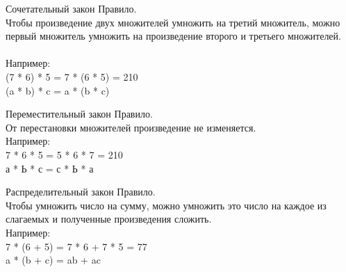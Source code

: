 \documentclass{beamer}
\begin{document}
\begin{frame}{Сочетательный закон}
Правило.\\
Чтобы произведение двух множителей умножить на третий множитель, можно первый множитель умножить на произведение второго и третьего множителей.\\
\\
Например:\\
(7 * 6) * 5 = 7 * (6 * 5) = 210\\
(a * b) * c = a * (b * c)
\end{frame}

\begin{frame}{Переместительный закон}
Правило.\\
От перестановки множителей произведение не изменяется.\\

Например:\\
7 * 6 * 5 = 5 * 6 * 7 = 210\\
а * Ь * с = с * Ь * а
\end{frame}

\begin{frame}{Распределительный закон}
Правило.\\
Чтобы умножить число на сумму, можно умножить это число на каждое из слагаемых и полученные произведения сложить.\\

Например:\\
7 * (6 + 5) = 7 * 6 + 7 * 5 = 77\\
a * (b + c) = ab + ac
\end{frame}
\end{document}
